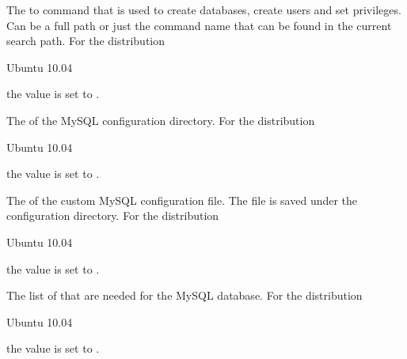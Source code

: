 The  to  command that is used to create databases,
create users and set privileges. Can be a full path or
just the command name that can be found in the current search path. 
For the distribution
\begin{inparaitem}
\item[\TheDistribution{ubuntu}] Ubuntu 10.04
\end{inparaitem}
the value is set to .


The  of the MySQL configuration directory.
For the distribution
\begin{inparaitem}
\item[\TheDistribution{ubuntu}] Ubuntu 10.04
\end{inparaitem}
the value is set to .


The  of the custom MySQL configuration file. The file is saved
under the configuration directory.
For the distribution
\begin{inparaitem}
\item[\TheDistribution{ubuntu}] Ubuntu 10.04
\end{inparaitem}
the value is set to .


The list of  that are needed for the MySQL database. 
For the distribution
\begin{inparaitem}
\item[\TheDistribution{ubuntu}] Ubuntu 10.04
\end{inparaitem}
the value is set to .


